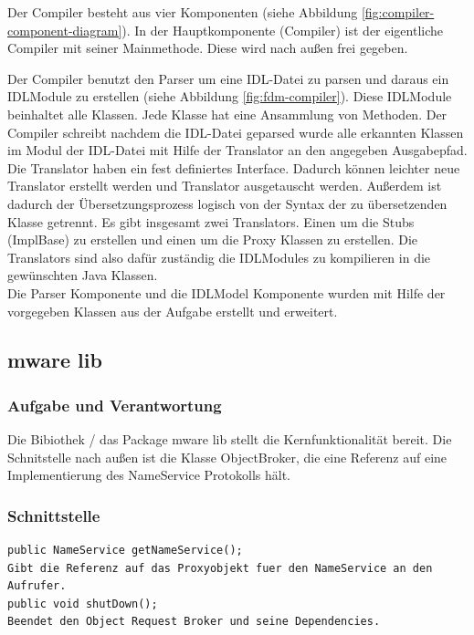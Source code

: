 \documentclass{article}
\begin{document}
Der Compiler besteht aus vier Komponenten (siehe Abbildung \ref{fig:compiler-component-diagram}). In der
Hauptkomponente (Compiler) ist der eigentliche Compiler mit seiner Mainmethode. Diese wird nach außen frei gegeben.

Der Compiler benutzt den Parser um eine IDL-Datei zu parsen und daraus ein IDLModule zu erstellen (siehe Abbildung
\ref{fig:fdm-compiler}). Diese IDLModule beinhaltet alle Klassen. Jede Klasse hat eine Ansammlung von Methoden.
Der Compiler schreibt nachdem die IDL-Datei geparsed wurde alle erkannten Klassen im Modul der IDL-Datei mit Hilfe der
Translator an den angegeben Ausgabepfad.\\

Die Translator haben ein fest definiertes Interface. Dadurch können leichter neue Translator erstellt werden und
Translator ausgetauscht werden. Außerdem ist dadurch der Übersetzungsprozess logisch von der Syntax der zu übersetzenden
Klasse getrennt.
Es gibt insgesamt zwei Translators. Einen um die Stubs (ImplBase) zu erstellen und einen
um die Proxy Klassen zu erstellen. Die Translators sind also dafür zuständig die IDLModules zu kompilieren in die
gewünschten Java Klassen.\\

Die Parser Komponente und die IDLModel Komponente wurden mit Hilfe der vorgegeben Klassen aus der Aufgabe erstellt und
erweitert.

\subsection{mware lib}
\subsubsection{Aufgabe und Verantwortung}
Die Bibiothek / das Package mware lib stellt die Kernfunktionalität bereit.
Die Schnitstelle nach außen ist die Klasse ObjectBroker, die eine Referenz auf eine
Implementierung des NameService Protokolls hält.


\subsubsection{Schnittstelle}
\begin{lstlisting}
public NameService getNameService();
Gibt die Referenz auf das Proxyobjekt fuer den NameService an den Aufrufer.
public void shutDown();
Beendet den Object Request Broker und seine Dependencies.
\end{lstlisting}
\end{document}
